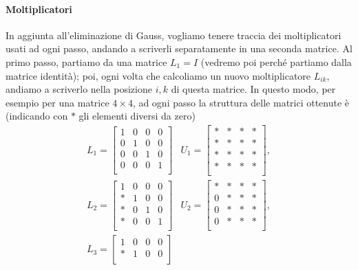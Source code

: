 \documentclass[a4paper]{report}
\theoremstyle{definition}
\theoremstyle{remark}
\begin{document}
\paragraph{Moltiplicatori}
In aggiunta all'eliminazione di Gauss, vogliamo tenere traccia dei moltiplicatori usati ad ogni passo, andando a scriverli separatamente in una seconda matrice. Al primo passo, partiamo da una matrice $L_1 = I$ (vedremo poi perché partiamo dalla matrice identità); poi, ogni volta che calcoliamo un nuovo moltiplicatore $L_{ik}$, andiamo a scriverlo nella posizione $i,k$ di questa matrice. In questo modo, per esempio per una matrice $4\times 4$,  ad ogni passo la struttura delle matrici ottenute è (indicando con $*$ gli elementi diversi da zero)
\[
    \begin{array}{ll}
    L_1 = \begin{bmatrix}
        1 & 0 & 0 & 0\\
        0 & 1 & 0 & 0\\
        0 & 0 & 1 & 0\\        
        0 & 0 & 0 & 1\\
    \end{bmatrix} 
    & U_1 = \begin{bmatrix}
        * & * & * & *\\
        * & * & * & *\\
        * & * & * & *\\
        * & * & * & *\\
    \end{bmatrix},\\[6ex]
    L_2 = \begin{bmatrix}
        1 & 0 & 0 & 0\\
        * & 1 & 0 & 0\\
        * & 0 & 1 & 0\\        
        * & 0 & 0 & 1\\
    \end{bmatrix} & U_2 = \begin{bmatrix}
        * & * & * & *\\
        0 & * & * & *\\
        0 & * & * & *\\
        0 & * & * & *\\
    \end{bmatrix},\\[6ex]
    L_3 = \begin{bmatrix}
        1 & 0 & 0 & 0\\
        * & 1 & 0 & 0\\

\end{bmatrix}
\end{array}\]
\end{document}
